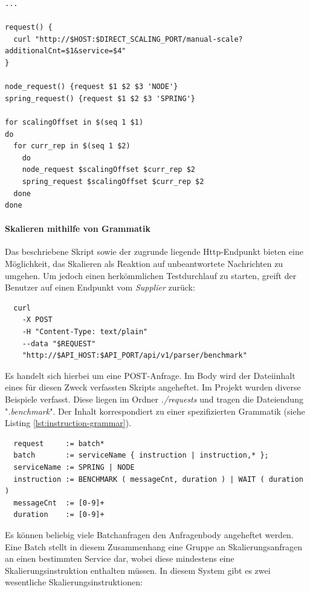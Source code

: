 \label{lst:direct-scaling}
\begin{minipage}{\linewidth}
\begin{lstlisting}[caption={direct-scaling},style=bashStyle]
...

request() {
  curl "http://$HOST:$DIRECT_SCALING_PORT/manual-scale?additionalCnt=$1&service=$4"
}

node_request() {request $1 $2 $3 'NODE'}
spring_request() {request $1 $2 $3 'SPRING'}

for scalingOffset in $(seq 1 $1)
do 
  for curr_rep in $(seq 1 $2)
	do 
    node_request $scalingOffset $curr_rep $2
    spring_request $scalingOffset $curr_rep $2
  done
done
\end{lstlisting}
\end{minipage}
\paragraph{Skalieren mithilfe von Grammatik}
Das beschriebene Skript sowie der zugrunde liegende Http-Endpunkt bieten eine Möglichkeit, das Skalieren als Reaktion auf unbeantwortete Nachrichten zu umgehen. Um jedoch einen herkömmlichen Testdurchlauf zu starten, greift der Benutzer auf einen Endpunkt vom \emph{Supplier} zurück: 

\begin{verbatim}
  curl 
    -X POST 
    -H "Content-Type: text/plain" 
    --data "$REQUEST" 
    "http://$API_HOST:$API_PORT/api/v1/parser/benchmark"
\end{verbatim}

Es handelt sich hierbei um eine POST-Anfrage. Im Body wird der Dateiinhalt eines für diesen Zweck verfassten Skripts angeheftet. Im Projekt wurden diverse Beispiele verfasst. Diese liegen im Ordner \emph{./requests} und tragen die Dateiendung "\emph{.benchmark}". Der Inhalt korrespondiert zu einer spezifizierten Grammatik (siehe Listing \ref{lst:instruction-grammar}).

\label{lst:instruction-grammar}
\begin{verbatim}
  request     := batch*
  batch       := serviceName { instruction | instruction,* };
  serviceName := SPRING | NODE
  instruction := BENCHMARK ( messageCnt, duration ) | WAIT ( duration )
  messageCnt  := [0-9]+
  duration    := [0-9]+
\end{verbatim}

Es können beliebig viele Batchanfragen den Anfragenbody angeheftet werden. Eine Batch stellt in diesem Zusammenhang eine Gruppe an Skalierungsanfragen an einen bestimmten Service dar, wobei diese mindestens eine Skalierungsinstruktion enthalten müssen. In diesem System gibt es zwei wesentliche Skalierungsinstruktionen: 

